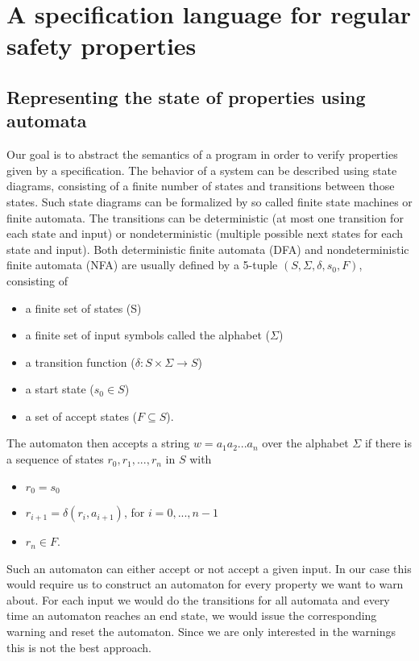 \chapter{A specification language for regular safety properties}
\section{Representing the state of properties using automata}
Our goal is to abstract the semantics of a program in order to verify properties given by a specification.
The behavior of a system can be described using state diagrams, consisting of a finite number of states and transitions between those states.
Such state diagrams can be formalized by so called finite state machines or finite automata.
The transitions can be deterministic (at most one transition for each state and input) or nondeterministic (multiple possible next states for each state and input).
Both deterministic finite automata (DFA) and nondeterministic finite automata (NFA) are usually defined by a 5-tuple $(S, \Sigma, \delta, s_0, F)$, consisting of
\begin{itemize}
\item a finite set of states (S)
\item a finite set of input symbols called the alphabet ($\Sigma$)
\item a transition function ($\delta : S \times \Sigma \rightarrow S$)
\item a start state ($s_0 \in S$)
\item a set of accept states ($F \subseteq S$).
\end{itemize}
The automaton then accepts a string $w = a_1 a_2 ... a_n$ over the alphabet $\Sigma$ if there is a sequence of states $r_0, r_1, ..., r_n$ in $S$ with
\begin{itemize}
\item $r_0 = s_0$
\item $r_{i+1} = \delta(r_i, a_{i+1})$, for $i=0, ..., n-1$
\item $r_n \in F$.
\end{itemize}
Such an automaton can either accept or not accept a given input. In our case this would require us to construct an automaton for every property we want to warn about. For each input we would do the transitions for all automata and every time an automaton reaches an end state, we would issue the corresponding warning and reset the automaton. Since we are only interested in the warnings this is not the best approach.

